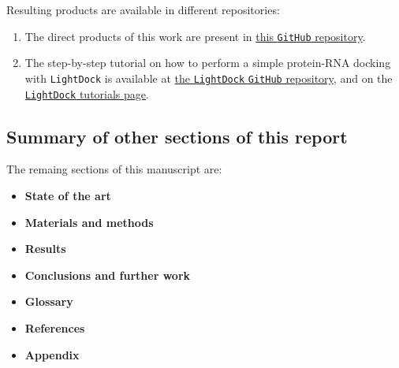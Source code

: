Resulting products are available in different repositories:
\begin{enumerate}
    \item The direct products of this work are present in \href{https://github.com/luksgrin/UOC_TFM}{this \texttt{GitHub} repository}.
    \item The step-by-step tutorial on how to perform a simple protein-RNA docking with \texttt{LightDock} is available at \href{https://github.com/lightdock/lightdock.github.io}{the \texttt{LightDock} \texttt{GitHub} repository}, and on the \href{https://lightdock.org/tutorials/}{\texttt{LightDock} tutorials page}.
\end{enumerate}

\subsection{Summary of other sections of this report}


The remaing sections of this manuscript are:

\begin{itemize}
    \item\textbf{State of the art}
    \item\textbf{Materials and methods}
    \item\textbf{Results}
    \item\textbf{Conclusions and further work}
    \item\textbf{Glossary}
    \item\textbf{References}
    \item\textbf{Appendix}
\end{itemize}